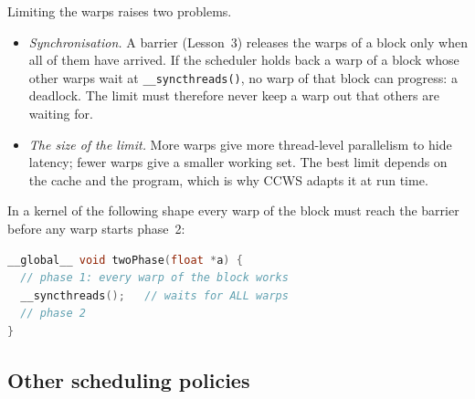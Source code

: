 \documentclass[../main.tex]{subfiles}
\begin{document}
Limiting the warps raises two problems.
\begin{itemize}
  \item \emph{Synchronisation.}  A barrier (Lesson~3) releases the
    warps of a block only when all of them have arrived.  If the
    scheduler holds back a warp of a block whose other warps wait at
    \texttt{\_\_syncthreads()}, no warp of that block can progress: a
    deadlock.  The limit must therefore never keep a warp out that
    others are waiting for.
  \item \emph{The size of the limit.}  More warps give more
    thread-level parallelism to hide latency; fewer warps give a
    smaller working set.  The best limit depends on the cache and the
    program, which is why CCWS adapts it at run time.
\end{itemize}
In a kernel of the following shape every warp of the block must reach
the barrier before any warp starts phase~2:

\begin{lstlisting}[language=C++, numbers=none]
__global__ void twoPhase(float *a) {
  // phase 1: every warp of the block works
  __syncthreads();   // waits for ALL warps
  // phase 2
}
\end{lstlisting}

\subsection{Other scheduling policies}
\end{document}
